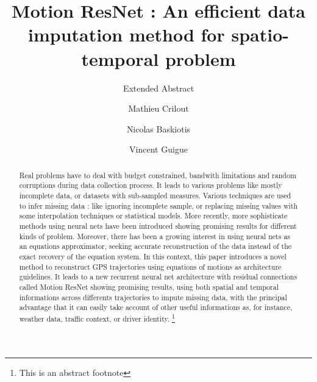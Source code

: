 \documentclass[sigconf,edbt]{acmart-edbt2020}
\begin{document}
\title{Motion ResNet : An efficient data imputation method for spatio-temporal problem}
\subtitle{Extended Abstract}
  

\author{Mathieu Crilout}
\authornote{}
\orcid{}

\author{Nicolas Baskiotis}
\authornote{}

\author{Vincent Guigue}
\authornote{}

\renewcommand{\shortauthors}{}


\begin{abstract}

Real problems have to deal with budget constrained, bandwith limitations and random corruptions during data collection process. It leads to various problems like mostly incomplete data, or datasets with sub-sampled measures. 
Various techniques are used to infer missing data : like ignoring incomplete sample, or replacing missing values with some interpolation techniques or statistical models.
More recently, more sophisticate methods using neural nets have been introduced showing promising results for different kinds of problem. Moreover, there has been a growing interest in using neural nets as an equations approximator, seeking accurate reconstruction of the data instead of the exact recovery of the equation system.
In this context, this paper introduces a novel method to reconstruct GPS trajectories using equations of motions as architecture guidelines.
It leads to a new recurrent neural net architecture with residual connections called Motion ResNet showing promising results, using both spatial and temporal informations across differents trajectories to impute missing data, with the principal advantage that it can easily take account of other useful informations as, for instance, weather data, traffic context, or driver identity.
\footnote{This is an abstract footnote}
\end{abstract}
\end{document}
